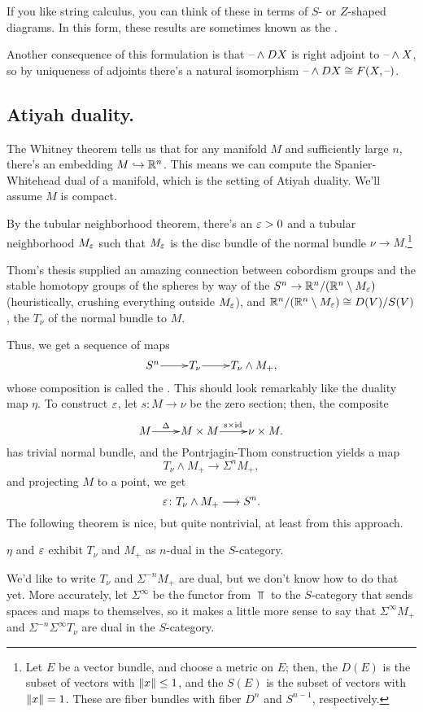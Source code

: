 If you like string calculus, you can think of these in terms of $S$- or $Z$-shaped diagrams. In this form, these
results are sometimes known as the .

Another consequence of this formulation is that $\text{--}\wedge DX$ is right adjoint to $\text{--}\wedge X$, so by uniqueness
of adjoints there's a natural isomorphism $\text{--}\wedge DX\cong F(X,\text{--})$.
\subsection*{Atiyah duality.}
The Whitney theorem tells us that for any manifold $M$ and sufficiently large $n$, there's an embedding
$M\hookrightarrow\mathbb R^n$. This means we can compute the Spanier-Whitehead dual of a manifold, which is the setting of Atiyah
duality. We'll assume $M$ is compact.

By the tubular neighborhood theorem, there's an $\varepsilon > 0$ and a tubular neighborhood $M_\varepsilon$ such that $M_\varepsilon$ is the
disc bundle of the normal bundle $\nu\to M$.\footnote{Let $E$ be a vector bundle, and choose a metric on $E$; then,
the  $D(E)$ is the subset of vectors with $\lVert x\rVert\le 1$, and the  $S(E)$ is
the subset of vectors with $\lVert x\rVert = 1$. These are fiber bundles with fiber $D^n$ and $S^{n-1}$, respectively.}

Thom's thesis supplied an amazing connection between cobordism groups and the stable homotopy groups of the
spheres by way of the  $S^n\to \mathbb R^n/(\mathbb R^n\setminus M_\varepsilon)$ (heuristically, crushing
everything outside $M_\varepsilon$), and $\mathbb R^n/(\mathbb R^n\setminus M_\varepsilon)\cong D(V)/S(V)$, the  $T_\nu$ of the
normal bundle to $M$.

Thus, we get a sequence of maps
\[\xymatrix@1{
	S^n\ar[r] & T_\nu\ar[r] & T_\nu\wedge M_+,
}\]
whose composition is called the . This should look remarkably like the duality map $\eta$. To
construct $\varepsilon$, let $s\colon M\to\nu$ be the zero section; then, the composite
\[\xymatrix@1{
	M\ar[r]^-\Delta & M\times M\ar[r]^{s\times\id} &\nu\times M.
}\]
has trivial normal bundle, and the Pontrjagin-Thom construction yields a map
\[T_\nu\wedge M_+\longrightarrow\Sigma^n M_+,\]
and projecting $M$ to a point, we get
\[\varepsilon\colon T_\nu\wedge M_+\longrightarrow S^n.\]
The following theorem is nice, but quite nontrivial, at least from this approach.
\begin{thm}
\label{atiyah_duality}
$\eta$ and $\varepsilon$ exhibit $T_\nu$ and $M_+$ as $n$-dual in the $S$-category.
\end{thm}
We'd like to write $T_\nu$ and $\Sigma^{-n}M_+$ are dual, but we don't know how to do that yet. More accurately,
let $\Sigma^\infty$ be the functor from $\Top$ to the $S$-category that sends spaces and maps to themselves, so it
makes a little more sense to say that $\Sigma^\infty M_+$ and $\Sigma^{-n}\Sigma^\infty T_\nu$ are dual in the
$S$-category.

